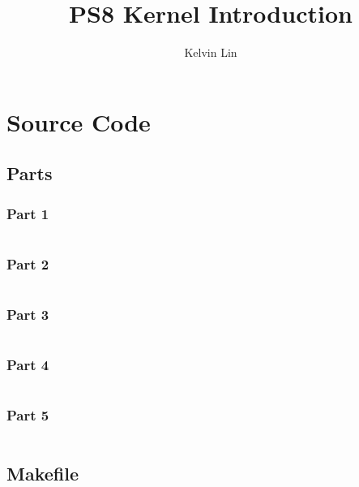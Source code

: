 \documentclass[12pt]{article}
\title{PS8 Kernel Introduction}
\author{Kelvin Lin}
\begin{document}
\maketitle

\section{Source Code}

\subsection{Parts}

\subsubsection{Part 1}
\begin{lstlisting}

\end{lstlisting}

\subsubsection{Part 2}
\begin{lstlisting}

\end{lstlisting}

\subsubsection{Part 3}
\begin{lstlisting}

\end{lstlisting}

\subsubsection{Part 4}
\begin{lstlisting}

\end{lstlisting}

\subsubsection{Part 5}
\begin{lstlisting}

\end{lstlisting}

\subsection{Makefile}
\end{document}
